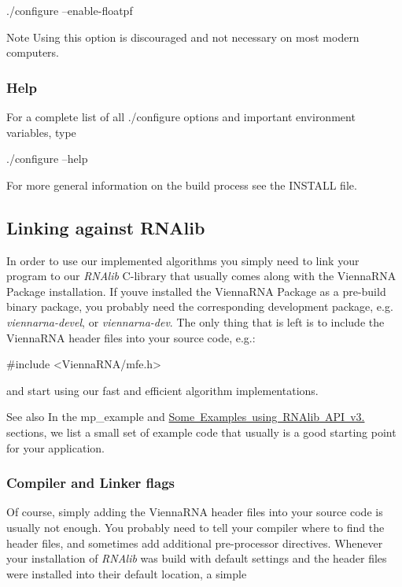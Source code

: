 \begin{DoxyVerb}./configure --enable-floatpf
\end{DoxyVerb}


\begin{DoxyNote}{Note}
Using this option is discouraged and not necessary on most modern computers.
\end{DoxyNote}
\hypertarget{install_config_help}{}\subsubsection{Help}\label{install_config_help}
For a complete list of all ./configure options and important environment variables, type

\begin{DoxyVerb}./configure --help
\end{DoxyVerb}


For more general information on the build process see the I\+N\+S\+T\+A\+LL file.\hypertarget{install_linking}{}\subsection{Linking against R\+N\+Alib}\label{install_linking}
In order to use our implemented algorithms you simply need to link your program to our {\itshape R\+N\+Alib} C-\/library that usually comes along with the Vienna\+R\+NA Package installation. If you\textquotesingle{}ve installed the Vienna\+R\+NA Package as a pre-\/build binary package, you probably need the corresponding development package, e.\+g. {\itshape viennarna-\/devel}, or {\itshape viennarna-\/dev}. The only thing that is left is to include the Vienna\+R\+NA header files into your source code, e.\+g.\+:

\begin{DoxyVerb}#include <ViennaRNA/mfe.h>
\end{DoxyVerb}


and start using our fast and efficient algorithm implementations.

\begin{DoxySeeAlso}{See also}
In the mp\+\_\+example and \mbox{\hyperlink{newAPI_newAPI_examples}{Some Examples using R\+N\+Alib A\+PI v3.}} sections, we list a small set of example code that usually is a good starting point for your application.
\end{DoxySeeAlso}
\hypertarget{install_linking_flags}{}\subsubsection{Compiler and Linker flags}\label{install_linking_flags}
Of course, simply adding the Vienna\+R\+NA header files into your source code is usually not enough. You probably need to tell your compiler where to find the header files, and sometimes add additional pre-\/processor directives. Whenever your installation of {\itshape R\+N\+Alib} was build with default settings and the header files were installed into their default location, a simple

